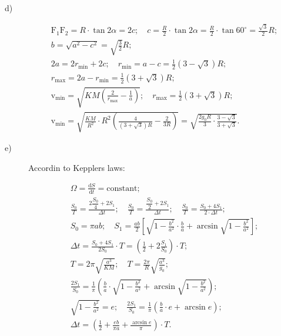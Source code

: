 \begin{description}
\item[d)]
  \begin{gather*}
    \mathrm{F_1F_2} = R\cdot\tan2\alpha = 2c;\quad
      c = \frac{R}{2}\cdot\tan2\alpha = \frac{R}{2}\cdot\tan60^\circ
      = \frac{\sqrt{3}}{2}R; \\
    b = \sqrt{a^2 - c^2} = \sqrt{\frac{3}{2}}R; \\
    2a = 2r_{\min} + 2c;\quad
      r_{\min} = a - c = \frac{1}{2}\left(3 - \sqrt{3}\right)R; \\
    r_{\max} = 2a - r_{\min} = \frac{1}{2}\left(3 + \sqrt{3}\right)R; \\
    \mathrm{v}_{\min} = \sqrt{KM\left(\frac{2}{r_{\max}}
      - \frac{1}{a}\right)};\quad
      r_{\max} = \frac{1}{2}\left(3 + \sqrt{3}\right)R; \\
    \mathrm{v}_{\min} = \sqrt{\frac{KM}{R^2}\cdot R^2
      \left(\frac{4}{\left(3 + \sqrt{3}\right)R} - \frac{2}{3R}\right)}
      = \sqrt{\frac{2g_0R}{3}\cdot\frac{3 - \sqrt{3}}{3 + \sqrt{3}}}.
  \end{gather*}

\item[e)] Accordin to Kepplers laws: %


  \begin{gather*}
    \Omega = \frac{\mathrm{d}S}{\mathrm{d}t} = \text{constant}; \\
    \frac{S_0}{T} = \frac{2\dfrac{S_0}{4} + 2S_1}{\Delta t};\quad
    \frac{S_0}{T} = \frac{\dfrac{S_0}{2} + 2S_1}{\Delta t};\quad
    \frac{S_0}{T} = \frac{S_0 + 4S_1}{2\cdot\Delta t}; \\
    S_0 = \pi ab;\quad
    S_1 = \frac{ab}{2}\left[\sqrt{1 - \frac{b^2}{a^2}}\cdot\frac{b}{a}
      + \arcsin\sqrt{1 - \frac{b^2}{a^2}}\right]; \\
    \Delta t = \frac{S_0 + 4S_1}{2S_0}\cdot T
      = \left(\frac{1}{2} + 2\frac{S_1}{S_0}\right)\cdot T; \\
    T = 2\pi\sqrt{\frac{a^3}{KM}};\quad
      T = \frac{2\pi}{R}\sqrt{\frac{a^3}{g_0}}; \\
    \frac{2S_1}{S_0} = \frac{1}{\pi}\left(\frac{b}{a}\cdot
      \sqrt{1 - \frac{b^2}{a^2}}
      + \arcsin\sqrt{1 - \frac{b^2}{a^2}}\right); \\
    \sqrt{1 - \frac{b^2}{a^2}} = e;\quad
      \frac{2S_1}{S_0} = \frac{1}{\pi}\left(\frac{b}{a}\cdot e
      + \arcsin e\right); \\
    \Delta t = \left(\frac{1}{2} + \frac{eb}{\pi a}
      + \frac{\arcsin e}{\pi}\right)\cdot T.
  \end{gather*}


\end{description}
